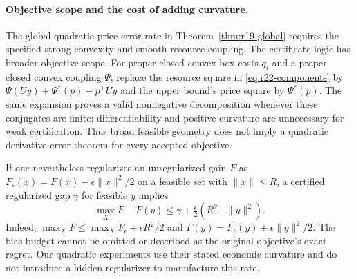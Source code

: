 \paragraph{Objective scope and the cost of adding curvature.}
The global quadratic price-error rate in Theorem~\ref{thm:r19-global} requires the specified strong convexity and smooth resource coupling. The certificate logic has broader objective scope. For proper closed convex box costs $q_i$ and a proper closed convex coupling $\Psi$, replace the resource square in \eqref{eq:r22-components} by
$\Psi(Uy)+\Psi^*(p)-p^\top Uy$ and the upper bound's price square by $\Psi^*(p)$. The same expansion proves a valid nonnegative decomposition whenever these conjugates are finite; differentiability and positive curvature are unnecessary for weak certification. Thus broad feasible geometry does not imply a quadratic derivative-error theorem for every accepted objective.

If one nevertheless regularizes an unregularized gain $F$ as
$F_\epsilon(x)=F(x)-\epsilon\|x\|^2/2$ on a feasible set with $\|x\|\leq R$, a certified regularized gap $\gamma$ for feasible $y$ implies
\begin{equation}\label{eq:r22-regularization}
 \max_XF-F(y)\leq\gamma+\tfrac\epsilon2(R^2-\|y\|^2).
\end{equation}
Indeed, $\max_XF\leq\max_XF_\epsilon+\epsilon R^2/2$ and
$F(y)=F_\epsilon(y)+\epsilon\|y\|^2/2$. The bias budget cannot be omitted or described as the original objective's exact regret. Our quadratic experiments use their stated economic curvature and do not introduce a hidden regularizer to manufacture this rate.
